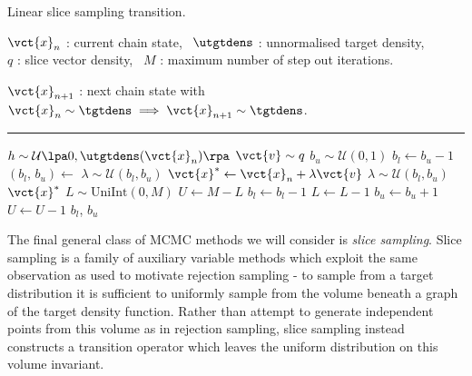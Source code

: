 \begin{algorithm}[!t]
\caption{Linear slice sampling transition.}
\label{alg:linear-slice-sampling}
\begin{algorithmic}
\small
    \Require
    $\vct{x}_n$ : current chain state,~
    $\utgtdens$ : unnormalised target density,\\
    $q$ : slice vector density,~
    $M$ : maximum number of step out iterations.
    \Ensure\raggedright
    $\vct{x}_{n+1}$ : next chain state with $\vct{x}_n \sim \tgtdens \implies \vct{x}_{n+1} \sim \tgtdens$.
\end{algorithmic}
\hrule
\small
\begin{algorithmic}[1]
  \State $h \sim \mathcal{U}\lpa 0,\utgtdens(\vct{x}_n)\rpa$ 
  \State $\vct{v} \sim q$ \label{algline:slice-sample-direction}
  \State $b_u \sim \mathcal{U}(0,1)$  
  \State $b_l \gets b_u - 1$
   $(b_l,\,b_u) \gets $ \EndIf
  \State $\lambda \sim \mathcal{U}(b_l, b_u)$
    \State $\vct{x}^* \gets \vct{x}_n + \lambda \vct{v}$  
      \State $\lambda \sim \mathcal{U}(b_l, b_u)$  
    \Else {}
      \State \Return $\vct{x}^*$
    \EndIf
  \EndWhile
   \label{algline:slice-sample-step-out-start}
    \State $L \sim \textrm{UniInt}(0, M)$ 
    \State $U \gets M - L$
    \While{$L > 0$ \textbf{and}\xspace $\utgtdens(\vct{x}_n + b_l \vct{v}) > h$} 
      \State $b_l \gets b_l - 1$
      \State $L \gets L - 1$
    \EndWhile
    \While{$U > 0$ \textbf{and}\xspace$\utgtdens(\vct{x}_n + b_u \vct{v}) > h$} 
      \State $b_u \gets b_u + 1$
      \State $U \gets U - 1$
    \EndWhile
    \State\Return $b_l$, $b_u$
  \EndFunction \label{algline:slice-sample-step-out-end}
\end{algorithmic}
\end{algorithm}

The final general class of \ac{MCMC} methods we will consider is \emph{slice sampling}. Slice sampling is a family of auxiliary variable methods which exploit the same observation as used to motivate rejection sampling - to sample from a target distribution it is sufficient to uniformly sample from the volume beneath a graph of the target density function. Rather than attempt to generate independent points from this volume as in rejection sampling, slice sampling instead constructs a transition operator which leaves the uniform distribution on this volume invariant.

